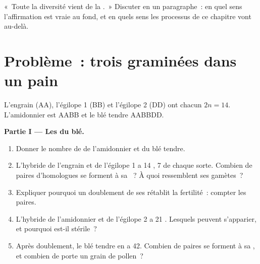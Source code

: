 \begin{exercise}[$\star\star\star$]\label{exo:g12:diversification-of-life:15}
«~Toute la diversité vient de la .~» Discuter en un
paragraphe~: en quel sens l'affirmation est vraie au fond, et en quels
sens les processus de ce chapitre vont au-delà.
\end{exercise}

\section{Problème~: trois graminées dans un pain}

\begin{problem}
\label{pb:g12:diversification-of-life:1}
L'engrain (AA), l'égilope 1 (BB) et l'égilope 2 (DD) ont chacun
$2n = 14$. L'amidonnier est AABB et le blé tendre AABBDD.

\medskip
\noindent\textbf{Partie I --- Les  du blé.}
\begin{enumerate}
  \item Donner le nombre de  de l'amidonnier et du blé
        tendre.
  \item L'hybride de l'engrain et de l'égilope 1 a 14 , 7 de
        chaque sorte. Combien de paires d'homologues se forment à sa
        ~? À quoi ressemblent ses gamètes~?
  \item Expliquer pourquoi un doublement de ses  rétablit la
        fertilité~: compter les paires.
  \item L'hybride de l'amidonnier et de l'égilope 2 a 21 .
        Lesquels peuvent s'apparier, et pourquoi est-il stérile~?
  \item Après doublement, le blé tendre en a 42. Combien de paires se
        forment à sa , et combien de  porte un grain
        de pollen~?
\end{enumerate}


\end{problem}
